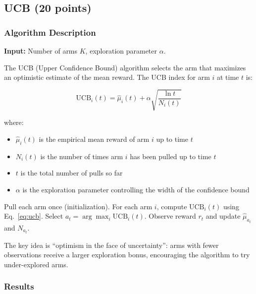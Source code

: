 \documentclass[11pt]{article}
\begin{document}
\subsection{UCB (20 points)}

\subsubsection{Algorithm Description}

\textbf{Input:} Number of arms $K$, exploration parameter $\alpha$.

The UCB (Upper Confidence Bound) algorithm selects the arm that maximizes an optimistic estimate of the mean reward. The UCB index for arm $i$ at time $t$ is:

\begin{equation}
\text{UCB}_i(t) = \hat{\mu}_i(t) + \alpha \sqrt{\frac{\ln t}{N_i(t)}}
\label{eq:ucb}
\end{equation}

where:
\begin{itemize}[noitemsep]
    \item $\hat{\mu}_i(t)$ is the empirical mean reward of arm $i$ up to time $t$
    \item $N_i(t)$ is the number of times arm $i$ has been pulled up to time $t$
    \item $t$ is the total number of pulls so far
    \item $\alpha$ is the exploration parameter controlling the width of the confidence bound
\end{itemize}

\begin{algorithm}[H]
\caption{UCB}
\begin{algorithmic}[1]
\State Pull each arm once (initialization).
    \State For each arm $i$, compute $\text{UCB}_i(t)$ using Eq.~\eqref{eq:ucb}.
    \State Select $a_t = \arg\max_{i} \text{UCB}_i(t)$.
    \State Observe reward $r_t$ and update $\hat{\mu}_{a_t}$ and $N_{a_t}$.
\EndFor
\end{algorithmic}
\end{algorithm}

The key idea is ``optimism in the face of uncertainty'': arms with fewer observations receive a larger exploration bonus, encouraging the algorithm to try under-explored arms.

\subsubsection{Results}
\end{document}

